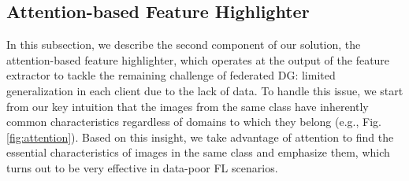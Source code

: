 \documentclass{article}
\theoremstyle{plain}
\theoremstyle{definition}
\theoremstyle{remark}
\begin{document}
\subsection{Attention-based Feature Highlighter}  \label{subsec:33}
  \vspace{-1mm}


 In this subsection, we describe the second component of our solution,  the attention-based feature highlighter, which operates at the output of the feature extractor to tackle  the remaining challenge of federated DG: limited generalization in each client due to the lack of data.  %
To handle this issue, we start from our key  intuition that the images  from the same class have inherently common characteristics  regardless of domains to which they belong  (e.g., Fig. \ref{fig:attention}). Based on this insight,   we take advantage of attention to find the essential characteristics of images in the same class and emphasize them, which turns out to be very effective in data-poor FL scenarios.   
\end{document}
